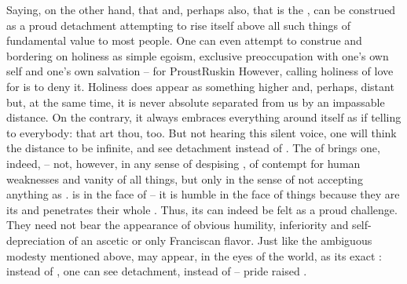 %
Saying, on the other hand, that  and, perhaps also, that
 is the , can be construed as a proud detachment
attempting to rise itself above all such things of fundamental value to most
people. One can even attempt to construe  and  bordering
on holiness as simple egoism, exclusive preoccupation with one's own self and
one's own salvation -- for \citet{that love occupies the highest place in the
  hierarchy of egoisms does not change the fact that it is
  egoistic.}{ProustRuskin}{}
However, calling holiness of love for  is to deny it. Holiness does
appear as something higher and, perhaps, distant but, at the same time, it is
never absolute  separated from us by an impassable distance. On
the contrary, it always embraces everything around itself as if telling to
everybody: that art thou, too. But not hearing this silent voice, one will think
the distance to be infinite, and see detachment instead of .  The
 of  brings one, indeed, 
-- not, however, in any sense of despising , of contempt for
human weaknesses and vanity of all things, but only in the sense of not
accepting anything  as .  is 
in the face of  -- it is humble in the face of 
things because they are its  and  penetrates their
whole . Thus, its  can indeed be felt as
a proud challenge. They need not bear the appearance of obvious humility,
inferiority and self-depreciation of an ascetic or only Franciscan
flavor.  Just like the ambiguous modesty mentioned above,
 may appear, in the eyes of the world, as its exact :
instead of , one can see detachment, instead of 
-- pride raised .

